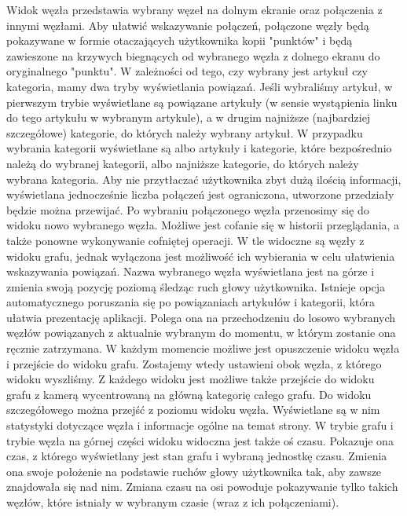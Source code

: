 Widok węzła przedstawia wybrany węzeł na dolnym ekranie oraz połączenia z innymi węzłami. Aby ułatwić wskazywanie połączeń, połączone węzły będą pokazywane w formie otaczających użytkownika kopii "punktów" i będą zawieszone na krzywych biegnących od wybranego węzła z dolnego ekranu do oryginalnego "punktu". W zależności od tego, czy wybrany jest artykuł czy kategoria, mamy dwa tryby wyświetlania powiązań. Jeśli wybraliśmy artykuł, w pierwszym trybie wyświetlane są powiązane artykuły (w sensie wystąpienia linku do tego artykułu w wybranym artykule), a w drugim najniższe (najbardziej szczegółowe)  kategorie, do których należy wybrany artykuł. W przypadku wybrania kategorii wyświetlane są albo artykuły i kategorie, które bezpośrednio należą do wybranej kategorii, albo najniższe kategorie, do których należy wybrana kategoria. Aby nie przytłaczać użytkownika zbyt dużą ilością informacji, wyświetlana jednocześnie liczba połączeń jest ograniczona, utworzone przedziały będzie można przewijać. Po wybraniu połączonego węzła przenosimy się do widoku nowo wybranego węzła. Możliwe jest cofanie się w historii przeglądania, a także ponowne wykonywanie cofniętej operacji. W tle widoczne są węzły z widoku grafu, jednak wyłączona jest możliwość ich wybierania w celu ułatwienia wskazywania powiązań. Nazwa wybranego węzła wyświetlana jest na górze i zmienia swoją pozycję poziomą śledząc ruch głowy użytkownika. Istnieje opcja automatycznego poruszania się po powiązaniach artykułów i kategorii, która ułatwia prezentację aplikacji. Polega ona na przechodzeniu do losowo wybranych węzłów powiązanych z aktualnie wybranym do momentu, w którym zostanie ona ręcznie zatrzymana. W każdym momencie możliwe jest opuszczenie widoku węzła i przejście do widoku grafu. Zostajemy wtedy ustawieni obok węzła, z którego widoku wyszliśmy. Z każdego widoku jest możliwe także przejście do widoku grafu z kamerą wycentrowaną na główną kategorię całego grafu.
Do widoku szczegółowego można przejść z poziomu widoku węzła. Wyświetlane są w nim statystyki dotyczące węzła i informacje ogólne na temat strony.
W trybie grafu i trybie węzła na górnej części widoku widoczna jest także oś czasu. Pokazuje ona czas, z którego wyświetlany jest stan grafu i wybraną jednostkę czasu. Zmienia ona swoje położenie na podstawie ruchów głowy użytkownika tak, aby zawsze znajdowała się nad nim. Zmiana czasu na osi powoduje pokazywanie tylko takich węzłów, które istniały w wybranym czasie (wraz z ich połączeniami).

